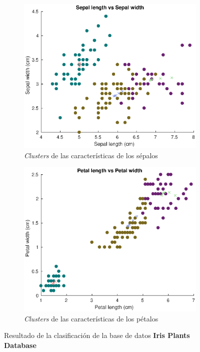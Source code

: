 \documentclass[11pt]{article} %
\begin{document}
\begin{figure}[h]
    \centering
    \begin{subfigure}[b]{0.435\textwidth}
        \includegraphics[width=\textwidth]{../src/fig/23_sepal.eps}
        \caption[]{\emph{Clusters} de las características de los sépalos}
        \label{fig:23:scatter:sepals}
    \end{subfigure}
    \quad
    \begin{subfigure}[b]{0.435\textwidth}
        \includegraphics[width=\textwidth]{../src/fig/23_petal.eps}
        \caption[]{\emph{Clusters} de las características de los pétalos}
        \label{fig:23:scatter:petals}
    \end{subfigure}
    \caption{Resultado de la clasificación de la base de datos
             \textbf{Iris Plants Database}}
     \label{fig:23:scatter}
\end{figure}
\end{document}
